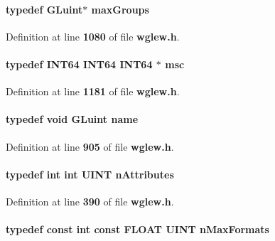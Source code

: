 \paragraph[{max\+Groups}]{\setlength{\rightskip}{0pt plus 5cm}typedef {\bf G\+Luint}$\ast$ {\bf max\+Groups}}\label{wglew_8h_a508519b99ae8663aba7fd349cc69997b}


Definition at line {\bf 1080} of file {\bf wglew.\+h}.

\paragraph[{msc}]{\setlength{\rightskip}{0pt plus 5cm}typedef {\bf I\+N\+T64} {\bf I\+N\+T64} {\bf I\+N\+T64} $\ast$ {\bf msc}}\label{wglew_8h_ac6ab09fc64bb73d869061c8f9a13c9fd}


Definition at line {\bf 1181} of file {\bf wglew.\+h}.

\paragraph[{name}]{\setlength{\rightskip}{0pt plus 5cm}typedef {\bf void} {\bf G\+Luint} {\bf name}}\label{wglew_8h_aee931c572fb72bbecd081085e5fd4132}


Definition at line {\bf 905} of file {\bf wglew.\+h}.

\paragraph[{n\+Attributes}]{\setlength{\rightskip}{0pt plus 5cm}typedef {\bf int} {\bf int} {\bf U\+I\+NT} {\bf n\+Attributes}}\label{wglew_8h_acbdabb26241c2bbf86c1a1ee4629c5c8}


Definition at line {\bf 390} of file {\bf wglew.\+h}.

\paragraph[{n\+Max\+Formats}]{\setlength{\rightskip}{0pt plus 5cm}typedef const {\bf int} const F\+L\+O\+AT {\bf U\+I\+NT} {\bf n\+Max\+Formats}}\label{wglew_8h_aca5696c6ab08d74792b53555406d4153}


